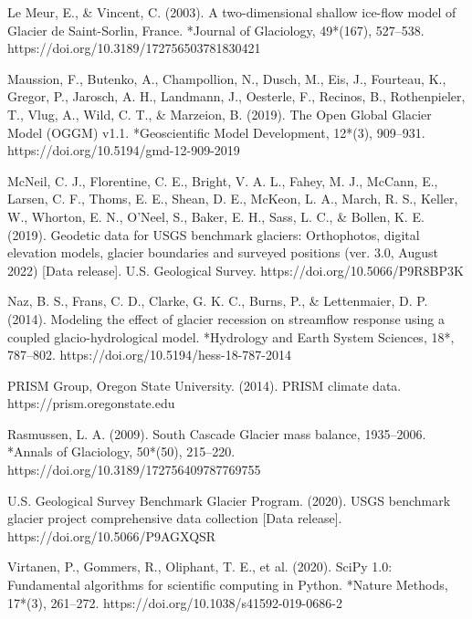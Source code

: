 \documentclass{article}
\begin{document}
\begin{thebibliography}{}
    Le Meur, E., \& Vincent, C. (2003). A two-dimensional shallow ice-flow model of Glacier de Saint-Sorlin, France. *Journal of Glaciology, 49*(167), 527–538. https://doi.org/10.3189/172756503781830421

    Maussion, F., Butenko, A., Champollion, N., Dusch, M., Eis, J., Fourteau, K., Gregor, P., Jarosch, A. H., Landmann, J., Oesterle, F., Recinos, B., Rothenpieler, T., Vlug, A., Wild, C. T., \& Marzeion, B. (2019). The Open Global Glacier Model (OGGM) v1.1. *Geoscientific Model Development, 12*(3), 909–931. https://doi.org/10.5194/gmd-12-909-2019

    McNeil, C. J., Florentine, C. E., Bright, V. A. L., Fahey, M. J., McCann, E., Larsen, C. F., Thoms, E. E., Shean, D. E., McKeon, L. A., March, R. S., Keller, W., Whorton, E. N., O’Neel, S., Baker, E. H., Sass, L. C., \& Bollen, K. E. (2019). Geodetic data for USGS benchmark glaciers: Orthophotos, digital elevation models, glacier boundaries and surveyed positions (ver. 3.0, August 2022) [Data release]. U.S. Geological Survey. https://doi.org/10.5066/P9R8BP3K

    Naz, B. S., Frans, C. D., Clarke, G. K. C., Burns, P., \& Lettenmaier, D. P. (2014). Modeling the effect of glacier recession on streamflow response using a coupled glacio-hydrological model. *Hydrology and Earth System Sciences, 18*, 787–802. https://doi.org/10.5194/hess-18-787-2014

    PRISM Group, Oregon State University. (2014). PRISM climate data. https://prism.oregonstate.edu

    Rasmussen, L. A. (2009). South Cascade Glacier mass balance, 1935–2006. *Annals of Glaciology, 50*(50), 215–220. https://doi.org/10.3189/172756409787769755

    U.S. Geological Survey Benchmark Glacier Program. (2020). USGS benchmark glacier project comprehensive data collection [Data release]. https://doi.org/10.5066/P9AGXQSR

    Virtanen, P., Gommers, R., Oliphant, T. E., et al. (2020). SciPy 1.0: Fundamental algorithms for scientific computing in Python. *Nature Methods, 17*(3), 261–272. https://doi.org/10.1038/s41592-019-0686-2

\end{thebibliography}
  
\end{document}
